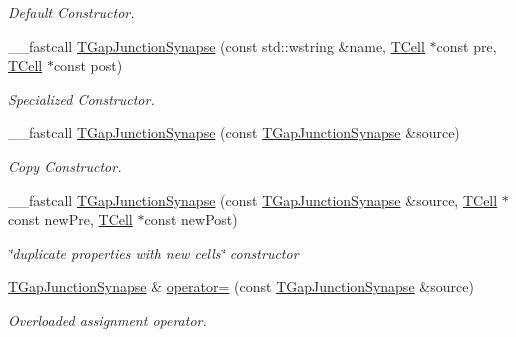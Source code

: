 \begin{DoxyCompactItemize}
\begin{DoxyCompactList}\small\item\em Default Constructor. \end{DoxyCompactList}\item 
\hypertarget{class_t_gap_junction_synapse_a39441e7b583baef4952344ab36bf024b}{\+\_\+\+\_\+fastcall \hyperlink{class_t_gap_junction_synapse_a39441e7b583baef4952344ab36bf024b}{T\+Gap\+Junction\+Synapse} (const std\+::wstring \&name, \hyperlink{class_t_cell}{T\+Cell} $\ast$const pre, \hyperlink{class_t_cell}{T\+Cell} $\ast$const post)}\label{class_t_gap_junction_synapse_a39441e7b583baef4952344ab36bf024b}

\begin{DoxyCompactList}\small\item\em Specialized Constructor. \end{DoxyCompactList}\item 
\hypertarget{class_t_gap_junction_synapse_aad3159733caef0ddcef738d3eb6e8ea2}{\+\_\+\+\_\+fastcall \hyperlink{class_t_gap_junction_synapse_aad3159733caef0ddcef738d3eb6e8ea2}{T\+Gap\+Junction\+Synapse} (const \hyperlink{class_t_gap_junction_synapse}{T\+Gap\+Junction\+Synapse} \&source)}\label{class_t_gap_junction_synapse_aad3159733caef0ddcef738d3eb6e8ea2}

\begin{DoxyCompactList}\small\item\em Copy Constructor. \end{DoxyCompactList}\item 
\hypertarget{class_t_gap_junction_synapse_a5a6165019f4f0040834942b6cb7a4687}{\+\_\+\+\_\+fastcall \hyperlink{class_t_gap_junction_synapse_a5a6165019f4f0040834942b6cb7a4687}{T\+Gap\+Junction\+Synapse} (const \hyperlink{class_t_gap_junction_synapse}{T\+Gap\+Junction\+Synapse} \&source, \hyperlink{class_t_cell}{T\+Cell} $\ast$const new\+Pre, \hyperlink{class_t_cell}{T\+Cell} $\ast$const new\+Post)}\label{class_t_gap_junction_synapse_a5a6165019f4f0040834942b6cb7a4687}

\begin{DoxyCompactList}\small\item\em \char`\"{}duplicate properties with new cells\char`\"{} constructor \end{DoxyCompactList}\item 
\hypertarget{class_t_gap_junction_synapse_ad8c58ce3dd34eb796357d34a6873ade4}{\hyperlink{class_t_gap_junction_synapse}{T\+Gap\+Junction\+Synapse} \& \hyperlink{class_t_gap_junction_synapse_ad8c58ce3dd34eb796357d34a6873ade4}{operator=} (const \hyperlink{class_t_gap_junction_synapse}{T\+Gap\+Junction\+Synapse} \&source)}\label{class_t_gap_junction_synapse_ad8c58ce3dd34eb796357d34a6873ade4}

\begin{DoxyCompactList}\small\item\em Overloaded assignment operator. \end{DoxyCompactList}\end{DoxyCompactItemize}
